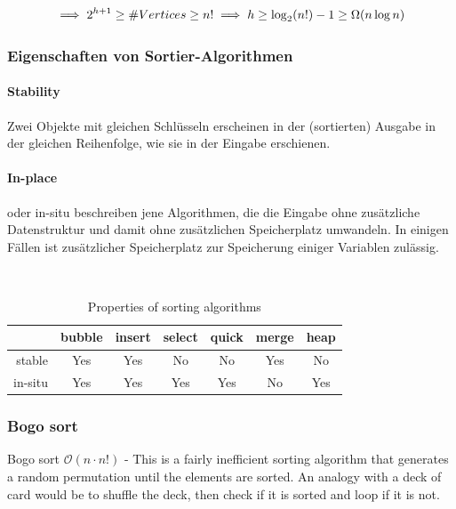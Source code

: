 \documentclass[a4paper]{article}
\begin{document}
\begin{equation*}
    \implies 2^{h+1} \geq \#Vertices \geq n! \\
    \implies h \geq \log_2(n!) -1 \geq \Omega(n\log n)
\end{equation*}


\subsubsection{Eigenschaften von Sortier-Algorithmen}

\paragraph{Stability} Zwei Objekte mit gleichen Schlüsseln erscheinen in der (sortierten) Ausgabe in der gleichen Reihenfolge, wie sie in der Eingabe erschienen.
\paragraph{In-place} oder in-situ beschreiben jene Algorithmen, die die Eingabe ohne zusätzliche Datenstruktur und damit ohne zusätzlichen Speicherplatz umwandeln. In einigen Fällen ist zusätzlicher Speicherplatz zur Speicherung einiger Variablen zulässig.

\begin{table}[H]
\centering
\caption{Properties of sorting algorithms}
\label{my-label}
~\\
\begin{tabular}{|r|c|c|c|c|c|c|@{}}
  \cline{2-7}
  \multicolumn{1}{c|}{} & \textbf{bubble} & \textbf{insert} & \textbf{select} & \textbf{quick} & \textbf{merge} & \textbf{heap} \\
        \hline
stable  & Yes      & Yes      & No      & No     & Yes     & No    \\
  in-situ & Yes      & Yes      & Yes      & Yes     & No     & Yes   \\
  \hline
\end{tabular}
\end{table}


\subsubsection{Bogo sort}
Bogo sort $\mathcal{O}(n\cdot n!)$ - This is a fairly inefficient sorting algorithm that generates a random permutation until the elements are sorted. An analogy with a deck of card would be to shuffle the deck, then check if it is sorted and loop if it is not. 
\end{document}
